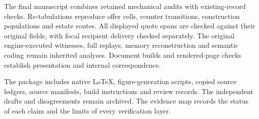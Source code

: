 The final manuscript combines retained mechanical audits with existing-record checks. Re-tabulations reproduce offer cells, counter transitions, construction populations and estate routes. All displayed quote spans are checked against their original fields, with focal recipient delivery checked separately. The original engine-executed witnesses, full replays, memory reconstruction and semantic coding remain inherited analyses. Document builds and rendered-page checks establish presentation and internal correspondence.

The package includes native LaTeX, figure-generation scripts, copied source ledgers, source manifests, build instructions and review records. The independent drafts and disagreements remain archived. The evidence map records the status of each claim and the limits of every verification layer.
